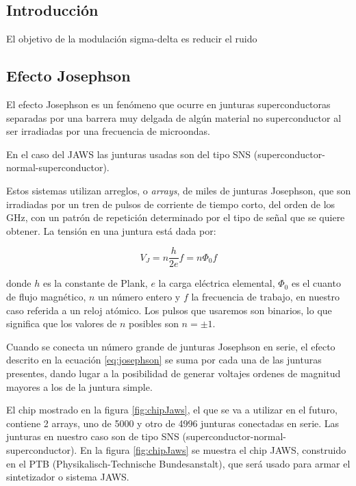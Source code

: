 \documentclass[twoside]{article}
\begin{document}
\begin{multicols}{2}

\section{Introducción}

El objetivo de la modulación sigma-delta es reducir el ruido 

\subsection{Efecto Josephson}



El efecto Josephson es un fenómeno que ocurre en junturas superconductoras separadas por una barrera muy delgada de algún material no superconductor al ser irradiadas por una frecuencia de microondas. 

En el caso del JAWS las junturas usadas son del tipo SNS (superconductor-normal-superconductor).

Estos sistemas utilizan arreglos, o {\it arrays}, de miles de junturas Josephson,  que son irradiadas por un tren de pulsos de corriente de tiempo corto, del orden de los GHz, con un patrón de repetición determinado por el tipo de señal que se quiere obtener. La tensión en una juntura está dada por:

\begin{equation}
    V_J = n \frac{h}{2e}f = n \Phi_0 f
    \label{eq:josephson}
\end{equation}

donde $h$ es la constante de Plank, $e$ la carga eléctrica elemental, $\Phi_0$ es el cuanto de flujo magnético, $n$ un número entero y $f$ la frecuencia de trabajo, en nuestro caso referida a un reloj atómico. Los pulsos que usaremos son binarios, lo que significa que los valores de $n$ posibles son $n=\pm 1$.

Cuando se conecta un número grande de junturas Josephson en serie, el efecto descrito en la ecuación \ref{eq:josephson} se suma por cada una de las junturas presentes, dando lugar a la posibilidad de generar voltajes ordenes de magnitud mayores a los de la juntura simple. 

El chip mostrado en la figura \ref{fig:chipJaws}, el que se va a utilizar en el futuro, contiene 2 arrays, uno de 5000 y otro de 4996 junturas conectadas en serie. Las junturas en nuestro caso son de tipo SNS (superconductor-normal-superconductor). En la figura \ref{fig:chipJaws} se muestra el chip JAWS, construido en el PTB (Physikalisch-Technische Bundesanstalt), que será usado para armar el sintetizador o sistema JAWS. \cite{kieler2009} \cite{kohlmann2009}


\end{multicols}
\end{document}
